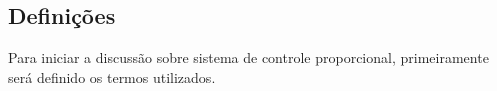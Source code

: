 \documentclass[portugues, brazil, a4paper,12pt]{article}
\begin{document}

	\subsection{Definições}
		Para iniciar a discussão sobre sistema de controle proporcional, primeiramente será definido os termos utilizados. 
\end{document}
